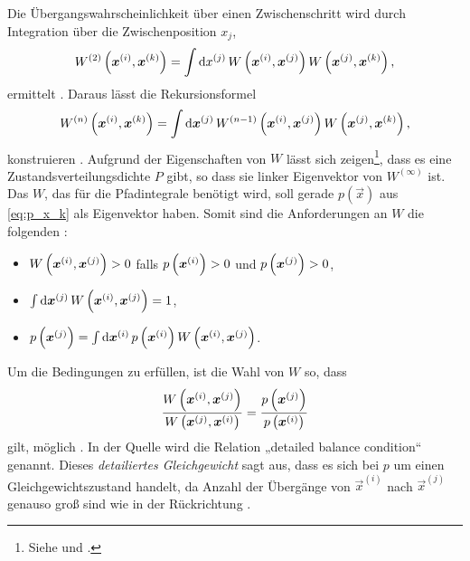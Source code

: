 Die Übergangswahrscheinlichkeit über einen Zwischenschritt wird durch
Integration über die Zwischenposition $x_j$,
\[
    W^{(2)}\del{\vec x^{(i)}, \vec x^{(k)}} = \int \dif x^{(j)} \, W\del{\vec
    x^{(i)}, \vec x^{(j)}} W\del{\vec x^{(j)}, \vec x^{(k)}},
\]
ermittelt \parencite[(3.9)]{Creutz/Statistical_Approach_QM}. Daraus lässt die
Rekursionsformel
\[
    W^{(n)}\del{\vec x^{(i)}, \vec x^{(k)}} = \int \dif \vec x^{(j)} \,
    W^{(n-1)}\del{\vec x^{(i)},
    \vec x^{(j)}} W\del{\vec x^{(j)}, \vec x^{(k)}},
\]
konstruieren \parencite[(3.10)]{Creutz/Statistical_Approach_QM}. Aufgrund der
Eigenschaften von $W$ lässt sich zeigen\footnote{Siehe
\parencite[435]{Creutz/Statistical_Approach_QM} und
\parencite[Anhang~B]{Creutz/Statistical_Approach_QM}.}, dass es eine
Zustandsverteilungsdichte $P$ gibt, so dass sie linker Eigenvektor von
$W^{(\infty)}$ ist. Das $W$, das für die Pfadintegrale benötigt wird, soll
gerade $p(\vec x)$ aus \eqref{eq:p_x_k} als Eigenvektor haben. Somit sind die
Anforderungen an $W$ die folgenden
\parencite[(3.18)]{Creutz/Statistical_Approach_QM}:
\begin{itemize}
    \item
        $W\del{\vec x^{(i)}, \vec x^{(j)}} > 0$ falls $p\del{\vec x^{(i)}} > 0$
        und $p\del{\vec x^{(j)}} > 0$,
    \item
        $\int \dif \vec x^{(j)} \, W\del{\vec x^{(i)}, \vec x^{(j)}} = 1$,
    \item
        $p\del{\vec x^{(j)}} = \int \dif \vec x^{(i)} \, p\del{\vec x^{(i)}}
        W\del{\vec x^{(i)}, \vec x^{(j)}}$.
\end{itemize}


Um die Bedingungen zu erfüllen, ist die Wahl von $W$ so, dass
\[
    \frac{W\del{\vec x^{(i)}, \vec x^{(j)}}}{W\del{\vec x^{(j)}, \vec x^{(i)}}}
    = \frac{p\del{\vec x^{(j)}}}{p\del{\vec x^{(i)}}}
\]
gilt, möglich \parencite[(3.23)]{Creutz/Statistical_Approach_QM}. In der Quelle
wird die Relation „detailed balance condition“ genannt. Dieses
\emph{detailiertes Gleichgewicht} sagt aus, dass es sich bei $p$ um einen
Gleichgewichtszustand handelt, da Anzahl der Übergänge von $\vec x^{(i)}$ nach
$\vec x^{(j)}$ genauso groß sind wie in der Rückrichtung
\parencite[85]{Schwabl/Quantenmechanik_fuer_Fortgeschrittene}.


